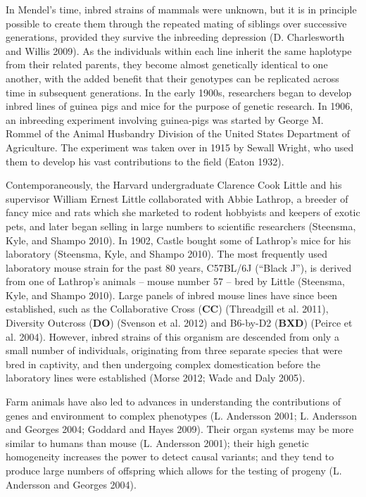 \documentclass[
]{book}
\begin{document}
In Mendel's time, inbred strains of mammals were unknown, but it is in principle possible to create them through the repeated mating of siblings over successive generations, provided they survive the inbreeding depression (D. Charlesworth and Willis 2009). As the individuals within each line inherit the same haplotype from their related parents, they become almost genetically identical to one another, with the added benefit that their genotypes can be replicated across time in subsequent generations. In the early 1900s, researchers began to develop inbred lines of guinea pigs and mice for the purpose of genetic research. In 1906, an inbreeding experiment involving guinea-pigs was started by George M. Rommel of the Animal Husbandry Division of the United States Department of Agriculture. The experiment was taken over in 1915 by Sewall Wright, who used them to develop his vast contributions to the field (Eaton 1932).

Contemporaneously, the Harvard undergraduate Clarence Cook Little and his supervisor William Ernest Little collaborated with Abbie Lathrop, a breeder of fancy mice and rats which she marketed to rodent hobbyists and keepers of exotic pets, and later began selling in large numbers to scientific researchers (Steensma, Kyle, and Shampo 2010). In 1902, Castle bought some of Lathrop's mice for his laboratory (Steensma, Kyle, and Shampo 2010). The most frequently used laboratory mouse strain for the past 80 years, C57BL/6J (``Black J''), is derived from one of Lathrop's animals -- mouse number 57 -- bred by Little (Steensma, Kyle, and Shampo 2010). Large panels of inbred mouse lines have since been established, such as the Collaborative Cross (\textbf{CC}) (Threadgill et al. 2011), Diversity Outcross (\textbf{DO}) (Svenson et al. 2012) and B6-by-D2 (\textbf{BXD}) (Peirce et al. 2004). However, inbred strains of this organism are descended from only a small number of individuals, originating from three separate species that were bred in captivity, and then undergoing complex domestication before the laboratory lines were established (Morse 2012; Wade and Daly 2005).

Farm animals have also led to advances in understanding the contributions of genes and environment to complex phenotypes (L. Andersson 2001; L. Andersson and Georges 2004; Goddard and Hayes 2009). Their organ systems may be more similar to humans than mouse (L. Andersson 2001); their high genetic homogeneity increases the power to detect causal variants; and they tend to produce large numbers of offspring which allows for the testing of progeny (L. Andersson and Georges 2004).
\end{document}
